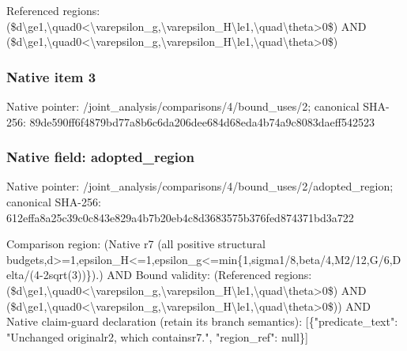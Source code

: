 \documentclass[10pt,a4paper]{article}
\begin{document}
\begingroup\raggedright\sloppy Referenced regions:\allowbreak{} (\$d\textbackslash{}ge1,\allowbreak{}\textbackslash{}quad0<\textbackslash{}varepsilon\_\allowbreak{}g,\allowbreak{}\textbackslash{}varepsilon\_\allowbreak{}H\textbackslash{}le1,\allowbreak{}\textbackslash{}quad\textbackslash{}theta>0\$) AND (\$d\textbackslash{}ge1,\allowbreak{}\textbackslash{}quad0<\textbackslash{}varepsilon\_\allowbreak{}g,\allowbreak{}\textbackslash{}varepsilon\_\allowbreak{}H\textbackslash{}le1,\allowbreak{}\textbackslash{}quad\textbackslash{}theta>0\$)\par\endgroup

\subsubsection{Native item 3}
Native pointer: /joint\_\allowbreak{}analysis/comparisons/4/bound\_\allowbreak{}uses/2; canonical SHA-256: 89de590ff6f4879bd77a8b6c6da206dee684d68eda4b74a9c8083daeff542523

\subsubsection{Native field: adopted\_\allowbreak{}region}
Native pointer: /joint\_\allowbreak{}analysis/comparisons/4/bound\_\allowbreak{}uses/2/adopted\_\allowbreak{}region; canonical SHA-256: 612effa8a25c39c0c843e829a4b7b20eb4c8d3683575b376fed874371bd3a722

\begingroup\raggedright\sloppy Comparison region:\allowbreak{} (Native r7 (all positive structural budgets,\allowbreak{}d>=\allowbreak{}1,\allowbreak{}epsilon\_\allowbreak{}H<=\allowbreak{}1,\allowbreak{}epsilon\_\allowbreak{}g<=\allowbreak{}min\{1,\allowbreak{}sigma1/\allowbreak{}8,\allowbreak{}beta/\allowbreak{}4,\allowbreak{}M2/\allowbreak{}12,\allowbreak{}G/\allowbreak{}6,\allowbreak{}Delta/\allowbreak{}(4-2sqrt(3))\}).) AND Bound validity:\allowbreak{} (Referenced regions:\allowbreak{} (\$d\textbackslash{}ge1,\allowbreak{}\textbackslash{}quad0<\textbackslash{}varepsilon\_\allowbreak{}g,\allowbreak{}\textbackslash{}varepsilon\_\allowbreak{}H\textbackslash{}le1,\allowbreak{}\textbackslash{}quad\textbackslash{}theta>0\$) AND (\$d\textbackslash{}ge1,\allowbreak{}\textbackslash{}quad0<\textbackslash{}varepsilon\_\allowbreak{}g,\allowbreak{}\textbackslash{}varepsilon\_\allowbreak{}H\textbackslash{}le1,\allowbreak{}\textbackslash{}quad\textbackslash{}theta>0\$)) AND Native claim-guard declaration (retain its branch semantics):\allowbreak{} [\{"predicate\_\allowbreak{}text":\allowbreak{} "Unchanged originalr2,\allowbreak{} which containsr7.",\allowbreak{} "region\_\allowbreak{}ref":\allowbreak{} null\}]\par\endgroup
\end{document}
